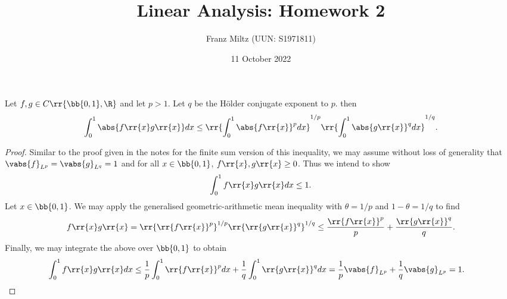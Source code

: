 \documentclass{article}
\begin{document}
\title{Linear Analysis: Homework 2}
\author{Franz Miltz (UUN: S1971811)}
\date{11 October 2022}
\maketitle

\begin{claim*}[2a]
	Let $f,g\in C\rr{\bb{0,1}, \R}$ and let $p>1$. Let $q$ be the H\"older conjugate exponent
	to $p$. then
	\begin{align}
		\label{holder}
		\int_0^1 \abs{f\rr{x}g\rr{x}}dx \leq \rr{\int_0^1 \abs{f\rr{x}}^p dx}^{1/p}\rr{\int_0^1 \abs{g\rr{x}}^q dx}^{1/q}.
	\end{align}
	\begin{proof}
		Similar to the proof given in the notes for the finite sum version of this inequality, we may assume without
		loss of generality that $\vabs{f}_{L^p}=\vabs{g}_{L^q}=1$ and for all $x\in\bb{0,1}$, $f\rr{x},g\rr{x}\geq 0$.
		Thus we intend to show
		\begin{align*}
			\int_0^1 f\rr{x}g\rr{x} dx \leq 1.
		\end{align*}
		Let $x\in\bb{0,1}$. We may apply the generalised geometric-arithmetic mean inequality with
		$\theta=1/p$ and $1-\theta=1/q$ to find
		\begin{align*}
			f\rr{x}g\rr{x}=\rr{\rr{f\rr{x}}^p}^{1/p} \rr{\rr{g\rr{x}}^q}^{1/q} \leq \frac{\rr{f\rr{x}}^p}{p} + \frac{\rr{g\rr{x}}^q}{q}.
		\end{align*}
		Finally, we may integrate the above over $\bb{0,1}$ to obtain
		\begin{align*}
			\int_0^1 f\rr{x}g\rr{x} dx & \leq \frac{1}{p}\int_0^1 \rr{f\rr{x}}^p dx + \frac{1}{q}\int_0^1 \rr{g\rr{x}}^q dx
			= \frac{1}{p} \vabs{f}_{L^p} + \frac{1}{q} \vabs{g}_{L^p} = 1.
		\end{align*}
	\end{proof}
\end{claim*}
\end{document}

